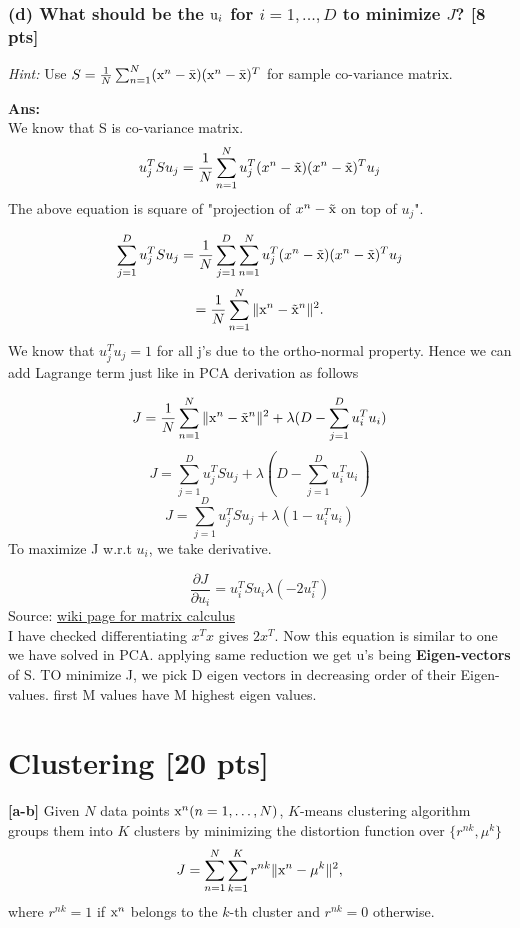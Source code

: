 \documentclass[twoside,10pt]{article}
\begin{document}
\subsubsection*{(d) What should be the $\text u_i$ for $i=1, ..., D$ to minimize $J$? [8 pts]}
\emph{Hint:} Use $S = \frac{1}{N} \sum_{n=1}^N (\text x^n - \bar{\text x})(\text x^n -
\bar{\text x})^T$ for sample co-variance matrix. \vspace{1cm}

\textbf{Ans:}\\
We know that S is co-variance matrix. 
$$u_j^TSu_j = \frac{1}{N} \sum_{n=1}^N {u_j^T(x^n-\tilde{\text x})(x^n-\tilde{\text x})^Tu_j}$$
The above equation is square of "projection of $x^n-\tilde{\text x}$ on top of $u_j$".

$$\sum_{j = 1}^D u_j^TSu_j = \frac{1}{N} \sum_{j = 1}^D \sum_{n=1}^N {u_j^T(x^n-\tilde{\text x})(x^n-\tilde{\text x})^Tu_j}$$
$$ = \frac{1}{N} \sum_{n=1}^N \| \text x^n - \tilde{\text x}^n \|^2.$$
We know that $u_j^Tu_j = 1$ for all j's due to the ortho-normal property.
Hence we can add Lagrange term just like in PCA derivation as follows

$$J = \frac{1}{N} \sum_{n=1}^N \| \text x^n - \tilde{\text x}^n \|^2 + \lambda (D - \sum_{j = 1}^D{u_i^Tu_i})$$
$$J = \sum_{j=1}^D{u_j^TSu_j} + \lambda (D - \sum_{j = 1}^D{u_i^Tu_i})$$
$$J = \sum_{j=1}^D{u_j^TSu_j+\lambda (1 - u_i^Tu_i)}$$
To maximize J w.r.t $u_i$, we take derivative.

$$\frac{\partial J}{\partial u_i} = {u_i^TSu_i\lambda ( - 2u_i^T)}$$
Source: \href{https://en.wikipedia.org/wiki/Matrix_calculus}{wiki page for matrix calculus} \\
I have checked differentiating $x^Tx$ gives $2x^T$.
Now this equation is similar to one we have solved in PCA. applying same reduction we get u's being \textbf{Eigen-vectors} of S. TO minimize J, we pick D eigen vectors in decreasing order of their Eigen-values. first M values have M highest eigen values.
\newpage
\section{Clustering [20 pts]}

\textbf{[a-b]} Given $N$ data points $\text x^n (n=1,\dots,N)$, $K$-means clustering algorithm groups them into $K$ clusters by minimizing the distortion function over $\{ r^{nk}, \mu^k \}$
$$J=\sum_{n=1}^N\sum_{k=1}^Kr^{nk} \|\text x^n-\mu^k\|^2,$$
where $r^{nk}=1$ if $\text x^n$ belongs to the $k$-th cluster and $r^{nk}=0$ otherwise.
\end{document}
